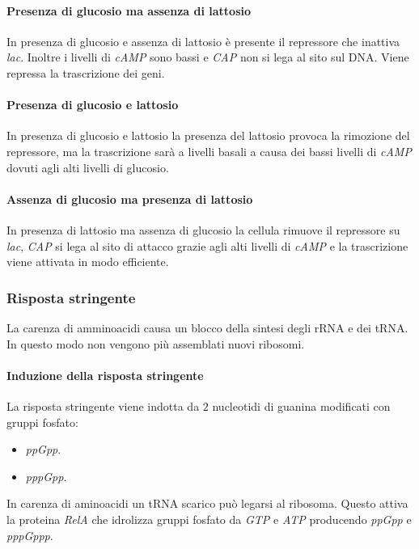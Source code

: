 			\paragraph{Presenza di glucosio ma assenza di lattosio}
			In presenza di glucosio e assenza di lattosio \`e presente il repressore che inattiva \emph{lac}.
			Inoltre i livelli di \emph{cAMP} sono bassi e \emph{CAP} non si lega al sito sul DNA.
			Viene repressa la trascrizione dei geni.

			\paragraph{Presenza di glucosio e lattosio}
			In presenza di glucosio e lattosio la presenza del lattosio provoca la rimozione del repressore, ma la trascrizione sar\`a a livelli basali a causa dei bassi livelli di \emph{cAMP} dovuti agli alti livelli di glucosio.

			\paragraph{Assenza di glucosio ma presenza di lattosio}
			In presenza di lattosio ma assenza di glucosio la cellula rimuove il repressore su \emph{lac}, \emph{CAP} si lega al sito di attacco grazie agli alti livelli di \emph{cAMP} e la trascrizione viene attivata in modo efficiente.

		\subsubsection{Risposta stringente}
		La carenza di amminoacidi causa un blocco della sintesi degli rRNA e dei tRNA.
		In questo modo non vengono pi\`u assemblati nuovi ribosomi.

			\paragraph{Induzione della risposta stringente}
			La risposta stringente viene indotta da $2$ nucleotidi di guanina modificati con gruppi fosfato:
			\begin{multicols}{2}
				\begin{itemize}
					\item \emph{ppGpp}.
					\item \emph{pppGpp}.
				\end{itemize}
			\end{multicols}
			In carenza di aminoacidi un tRNA scarico può legarsi al ribosoma.
			Questo attiva la proteina \emph{RelA} che idrolizza gruppi fosfato da \emph{GTP} e \emph{ATP} producendo \emph{ppGpp} e \emph{pppGppp}.

